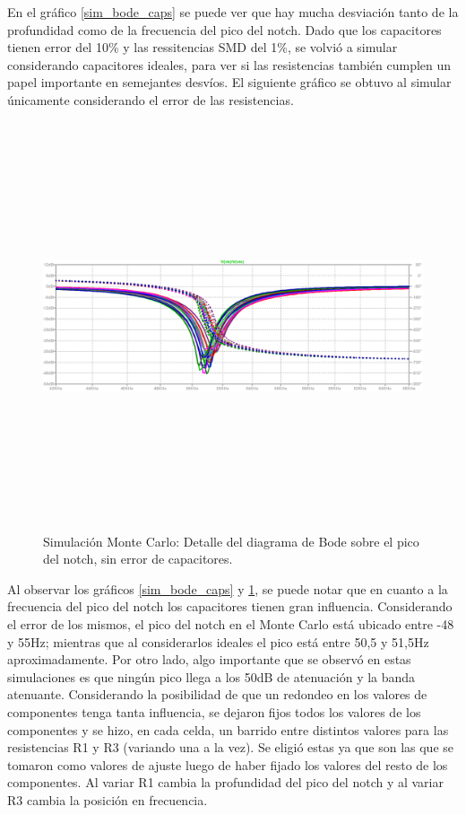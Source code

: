 En el gr\'afico \ref{sim_bode_caps} se puede ver que hay mucha desviaci\'on tanto de la profundidad como de la frecuencia del pico del notch. Dado que los capacitores tienen error del 10\% y las ressitencias SMD del 1\%, se volvi\'o a simular considerando capacitores ideales, para ver si las resistencias tambi\'en cumplen un papel importante en semejantes desv\'ios. El siguiente gr\'afico se obtuvo al simular \'unicamente considerando el error de las resistencias.

\begin{figure}[H] %
	\centering	\includegraphics[width=12cm,height=12cm,keepaspectratio]{../EJ4/graficos/h_montecarlo_detalle.png}
	\caption{Simulaci\'on Monte Carlo: Detalle del diagrama de Bode sobre el pico del notch, sin error de capacitores.}
	\label{sim_bode_detalle}
\end{figure}

Al observar los gr\'aficos \ref{sim_bode_caps} y \ref{sim_bode_detalle}, se puede notar que en cuanto a la frecuencia del pico del notch los capacitores tienen gran influencia. Considerando el error de los mismos, el pico del notch en el Monte Carlo est\'a ubicado entre -48 y 55Hz; mientras que al considerarlos ideales el pico est\'a entre 50,5 y 51,5Hz aproximadamente. Por otro lado, algo importante que se observ\'o en estas simulaciones es que ning\'un pico llega a los 50dB de atenuaci\'on y la banda atenuante. Considerando la posibilidad de que un redondeo en los valores de componentes tenga tanta influencia, se dejaron fijos todos los valores de los componentes y se hizo, en cada celda, un barrido entre distintos valores para las resistencias R1 y R3 (variando una a la vez). Se eligi\'o estas ya que son las que se tomaron como valores de ajuste luego de haber fijado los valores del resto de los componentes. Al variar R1 cambia la profundidad del pico del notch y al variar R3 cambia la posici\'on en frecuencia. 

